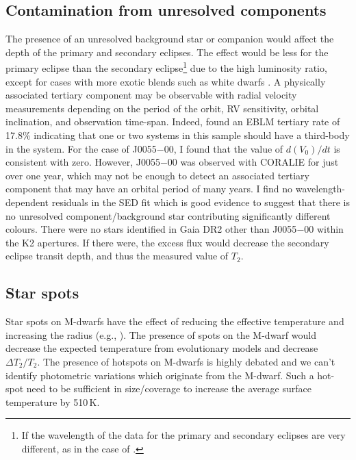 \subsection{Contamination from unresolved components}

The presence of an unresolved background star or companion would affect the depth of the primary and secondary eclipses. The effect would be less for the primary eclipse than the secondary eclipse\footnote{If the wavelength of the data for the primary and secondary eclipses are very different, as in the case of \citet{2014A&A...572A..50G}.} due to the high luminosity ratio, except for cases with more exotic blends such as white dwarfs \citep{2014A&A...572A..50G}. A physically associated tertiary component may be observable with radial velocity measurements depending on the period of the orbit, RV sensitivity, orbital inclination, and observation time-span. Indeed, \citet{Triaud2017} found an EBLM tertiary rate of 17.8\% indicating that one or two systems in this sample should have a third-body in the system. For the case of J0055$-$00, I found that the value of $d(V_0) / dt$ is consistent with zero. However, J0055$-$00 was observed with CORALIE for just over one year, which may not be enough to detect an associated tertiary component that may have an orbital period of many years. I find no wavelength-dependent residuals in the SED fit which is good evidence to suggest that there is no unresolved component/background star contributing significantly different colours. There were no stars identified in Gaia DR2 other than J0055$-$00 within the K2 apertures. If there were, the excess flux would decrease the secondary eclipse transit depth, and thus the measured value of $T_2$.   



\subsection{Star spots}

Star spots on M-dwarfs have the effect of reducing the effective temperature and increasing the radius (e.g., \citealt{2007A&A...472L..17C}). The presence of spots on the M-dwarf would decrease the expected temperature from evolutionary models and decrease $\Delta T_2 / T_2$. The presence of hotspots on M-dwarfs is highly debated \citep{2014A&A...572A..50G} and we can't identify photometric variations which originate from the M-dwarf. Such a hot-spot need to be sufficient in size/coverage to increase the average surface temperature by 510\,K. 


